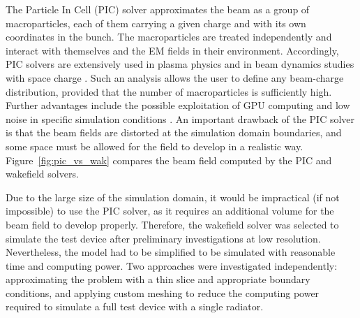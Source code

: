 The Particle In Cell (PIC) solver approximates the beam as a group of macroparticles, each of them carrying a given charge and with its own coordinates in the bunch. The macroparticles are treated independently and interact with themselves and the EM fields in their environment. Accordingly, PIC solvers are extensively used in plasma physics \cite{OSIRIS} and in beam dynamics studies with space charge \cite{pyORBIT}. Such an analysis allows the user to define any beam-charge distribution, provided that the number of macroparticles is sufficiently high. Further advantages include the possible exploitation of GPU computing and low noise in specific simulation conditions \cite{PIC:reduction_noise}. An important drawback of the PIC solver is that the beam fields are distorted at the simulation domain boundaries, and some space must be allowed for the field to develop in a realistic way. Figure~\ref{fig:pic_vs_wak} compares the beam field computed by the PIC and wakefield solvers. 

Due to the large size of the simulation domain, it would be impractical (if not impossible) to use the PIC solver, as it requires an additional volume for the beam field to develop properly. Therefore, the wakefield solver was selected to simulate the test device after preliminary investigations at low resolution. Nevertheless, the model had to be simplified to be simulated with reasonable time and computing power. Two approaches were investigated independently: approximating the problem with a thin slice and appropriate boundary conditions, and applying custom meshing to reduce the computing power required to simulate a full test device with a single radiator.


